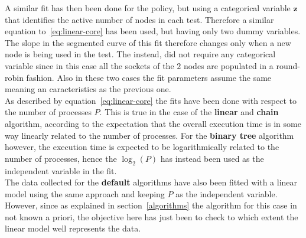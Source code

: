 \documentclass[../main.tex]{subfiles}
\begin{document}
A similar fit has then been done for the  policy, but using a categorical variable $\mathbf{z}$ that identifies the active number of nodes in each test. Therefore a similar equation to~\ref{eq:linear-core} has been used, but having only two dummy variables. The slope in the segmented curve of this fit therefore changes only when a new node is being used in the test. The  instead, did not require any categorical variable since in this case all the sockets of the $2$ nodes are populated in a round-robin fashion. Also in these two cases the fit parameters assume the same meaning an caracteristics as the previous one.\\
As described by equation~\ref{eq:linear-core} the fits have been done with respect to the number of processes $P$. This is true in the case of the \textbf{linear} and \textbf{chain} algorithm, according to the expectation that the overall execution time is in some way linearly related to the number of processes. For the \textbf{binary tree} algorithm however, the execution time is expected to be logarithmically related to the number of processes, hence the $\log_2(P)$ has instead been used as the independent variable in the fit.\\
The data collected for the \textbf{default} algorithms have also been fitted with a linear model using the same approach and keeping $P$ as the independent variable. However, since as explained in section~\ref{algorithms} the algorithm for this case in not known a priori, the objective here has just been to check to which extent the linear model well represents the data.\\
\end{document}
